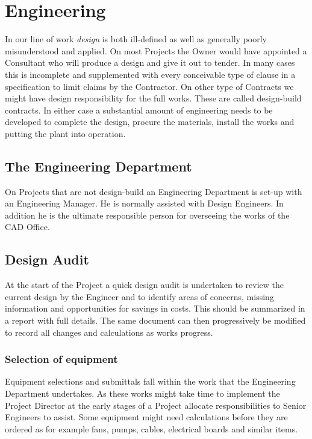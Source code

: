 \chapter{Engineering}

In our line of work \textit{design} is both ill-defined as well as generally poorly
misunderstood and applied. On most Projects the Owner would have appointed a
Consultant who will produce a design and give it out to tender. In many cases
this is incomplete and supplemented with every conceivable type of clause in a
specification to limit claims by the Contractor. On other type of Contracts we
might have design responsibility for the full works. These are called design-build contracts. In either case a substantial amount of engineering needs to be developed
to complete the design, procure the materials, install the works and putting the
plant into operation.



\section*{The Engineering Department}

On Projects that are not design-build an Engineering Department is set-up with
an Engineering Manager. He is normally assisted with Design Engineers. In addition
he is the ultimate responsible person for overseeing the works of the CAD Office.

\section{Design Audit}

At the start of the Project a quick design audit is undertaken to review the
current design by the Engineer and to identify areas of concerns, missing information and opportunities for savings in costs. This should be summarized in a report with
full details. The same document can then progressively be modified to record all
changes and calculations as works progress.

\subsection*{Selection of equipment}

Equipment selections and submittals fall within the work that the Engineering Department undertakes. As these works might take time to implement the Project Director at the early stages of a Project allocate responsibilities to Senior
Engineers to assist. Some equipment might need calculations before they are ordered as for example fans, pumps, cables, electrical boards and similar items.


